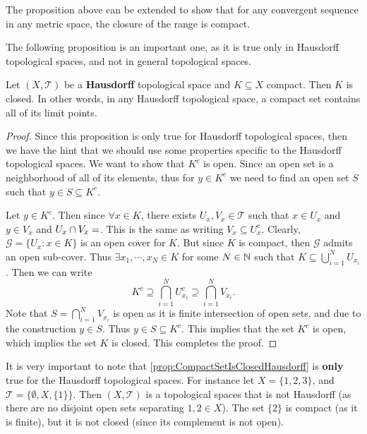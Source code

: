 \begin{remark}
	The proposition above can be extended to show that for any convergent sequence in any metric space, the closure of the range is compact.
\end{remark}

The following proposition is an important one, as it is true only in Hausdorff topological spaces, and not in general topological spaces.

\begin{proposition}
	\label{prop:CompactSetIsClosedHausdorff}
	Let $(X,\mathcal{T})$ be a \textbf{Hausdorff} topological space and $K \subseteq X$ compact. Then $K$ is closed. In other words, in any Hausdorff topological space, a compact set contains all of its limit points. 
\end{proposition}

\begin{proof}
	Since this proposition is only true for Hausdorff topological spaces, then we have the hint that we should use some properties specific to the Hausdorff topological spaces. We want to show that $K^c$ is open. Since an open set is a neighborhood of all of its elements, thus for $y \in K^c$ we need to find an open set $S$ such that $y \in S \subseteq K^c$.
	
	Let $y \in K^c$. Then since $\forall x \in K$, there exists $U_x, V_x \in \mathcal{T}$ such that $ x \in U_x$ and $y \in V_x$ and $U_x \cap V_x = \empty$. This is the same as writing $V_x \subseteq U_x^c$. Clearly, $\mathcal{G} = \{ U_x: x \in K \}$ is an open cover for $K$. But since $K$ is compact, then $\mathcal{G}$ admits an open sub-cover. Thus $\exists x_1, \cdots, x_N \in K$ for some $N \in \mathbb{N}$ such that $K \subseteq \bigcup_{i=1}^{N} U_{x_i}$. Then we can write
	\[ K^c \supseteq \bigcap_{i=1}^{N} U_{x_i}^c \supseteq \bigcap_{i=1}^{N} V_{x_i}. \]
	Note that $S = \bigcap_{i=1}^{N} V_{x_i} $ is open as it is finite intersection of open sets, and due to the construction $y \in S$. Thus $ y \in S \subseteq K^c$. This implies that the set $K^c$ is open, which implies the set $K$ is closed. This completes the proof. 
\end{proof}

\begin{remark}
	It is very important to note that \autoref{prop:CompactSetIsClosedHausdorff} is \textbf{only} true for the Hausdorff topological spaces. For instance let $X = \{1,2,3\}$, and $\mathcal{T} = \{ \emptyset, X, \{1\} \}$. Then $(X,\mathcal{T})$ is a topological spaces that is not Hausdorff (as there are no disjoint open sets separating $1,2 \in X$). The set $\{2\}$ is compact (as it is finite), but it is not closed (since its complement is not open).
\end{remark}

